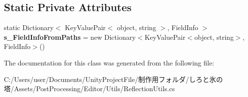 \subsection*{Static Private Attributes}
\begin{DoxyCompactItemize}
\item 
\mbox{\label{class_unity_editor_1_1_post_processing_1_1_reflection_utils_abf615db2cb28960e27c0b79337a1e88e}} 
static Dictionary$<$ Key\+Value\+Pair$<$ object, string $>$, Field\+Info $>$ {\bfseries s\+\_\+\+Field\+Info\+From\+Paths} = new Dictionary$<$Key\+Value\+Pair$<$object, string$>$, Field\+Info$>$()
\end{DoxyCompactItemize}


The documentation for this class was generated from the following file\+:\begin{DoxyCompactItemize}
\item 
C\+:/\+Users/user/\+Documents/\+Unity\+Project\+File/制作用フォルダ/しろと氷の塔/\+Assets/\+Post\+Processing/\+Editor/\+Utils/Reflection\+Utils.\+cs\end{DoxyCompactItemize}

